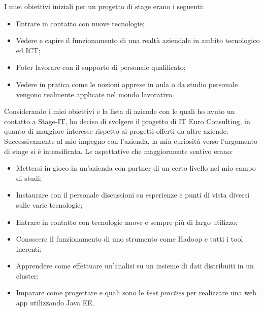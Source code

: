 I miei obiettivi iniziali per un progetto di stage erano i seguenti:
\begin{itemize}
	\item Entrare in contatto con nuove tecnologie;
	\item Vedere e capire il funzionamento di una realtà aziendale in ambito tecnologico ed ICT;
	\item Poter lavorare con il supporto di personale qualificato;
	\item Vedere in pratica come le nozioni apprese in aula o da studio personale vengono realmente applicate nel mondo lavorativo.
\end{itemize}
Considerando i miei obiettivi e la lista di aziende con le quali ho avuto un contatto a Stage-IT, ho deciso di svolgere il progetto di IT Euro Consulting, in quanto di maggiore interesse rispetto ai progetti offerti da altre aziende.
Successivamente al mio impegno con l'azienda, la mia curiosità verso l'argomento di stage si è intensificata. Le aspettative che maggiormente sentivo erano:
\begin{itemize}
	\item Mettersi in gioco in un'azienda con partner di un certo livello nel mio campo di studi;
	\item Instaurare con il personale discussioni su esperienze e punti di vista diversi sulle varie tecnologie;
	\item Entrare in contatto con tecnologie nuove e sempre più di largo utilizzo;
	\item Conoscere il funzionamento di uno strumento come Hadoop e tutti i tool inerenti;
	\item Apprendere come effettuare un'analisi su un insieme di dati distribuiti in un \gls{cluster};
	\item Imparare come progettare e quali sono le \textit{best practies} per realizzare una \gls{web app} utilizzando Java EE.
\end{itemize}

